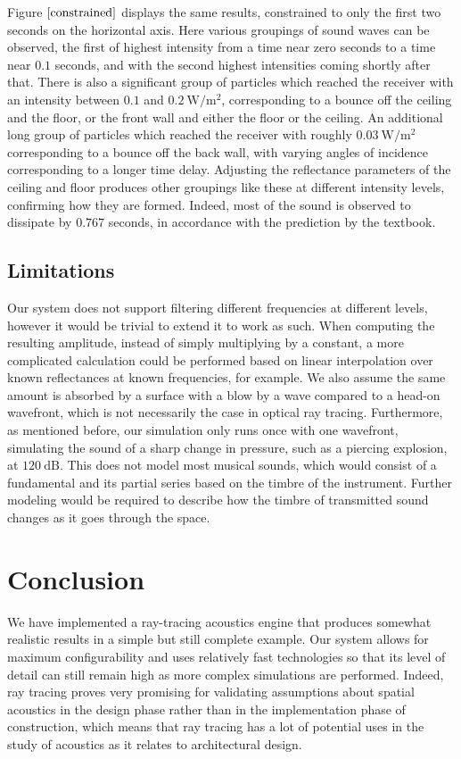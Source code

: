 \documentclass[10pt]{article}
\begin{document}
Figure $\ref{constrained}$ displays the same results, constrained to only the
first two seconds on the horizontal axis.  Here various groupings of sound waves
can be observed, the first of highest intensity from a time near zero seconds to
a time near $0.1$ seconds, and with the second highest intensities coming
shortly after that.  There is also a significant group of particles which
reached the receiver with an intensity between $0.1$ and $0.2~\mathrm{W/m^2}$,
corresponding to a bounce off the ceiling and the floor, or the front wall and
either the floor or the ceiling.  An additional long group of particles which
reached the receiver with roughly $0.03~\mathrm{W/m^2}$ corresponding to a
bounce off the back wall, with varying angles of incidence corresponding to a
longer time delay.  Adjusting the reflectance parameters of the ceiling and
floor produces other groupings like these at different intensity levels,
confirming how they are formed.  Indeed, most of the sound is observed to
dissipate by $0.767$ seconds, in accordance with the prediction by the textbook.

\subsection{Limitations}

Our system does not support filtering different frequencies at different levels,
however it would be trivial to extend it to work as such.  When computing the
resulting amplitude, instead of simply multiplying by a constant, a more
complicated calculation could be performed based on linear interpolation over
known reflectances at known frequencies, for example.  We also assume the same
amount is absorbed by a surface with a blow by a wave compared to a head-on
wavefront, which is not necessarily the case in optical ray tracing.
Furthermore, as mentioned before, our simulation only runs once with one
wavefront, simulating the sound of a sharp change in pressure, such as a
piercing explosion, at $120~\mathrm{dB}$.  This does not model most musical
sounds, which would consist of a fundamental and its partial series based on the
timbre of the instrument.  Further modeling would be required to describe how
the timbre of transmitted sound changes as it goes through the space.

\section{Conclusion}

We have implemented a ray-tracing acoustics engine that produces somewhat
realistic results in a simple but still complete example.  Our system allows for
maximum configurability and uses relatively fast technologies so that its level
of detail can still remain high as more complex simulations are performed.
Indeed, ray tracing proves very promising for validating assumptions about
spatial acoustics in the design phase rather than in the implementation phase of
construction, which means that ray tracing has a lot of potential uses in the
study of acoustics as it relates to architectural design.

\printbibliography
\end{document}
